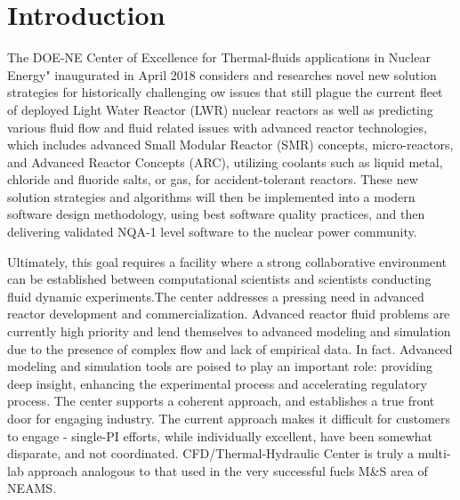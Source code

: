 \section{Introduction}
\label{s:intro}

The DOE-NE Center of Excellence for Thermal-fluids applications in Nuclear Energy" inaugurated in April 2018 considers and researches novel new solution strategies for historically challenging
ow issues that still plague the current fleet of deployed Light Water Reactor (LWR) nuclear reactors as well as predicting various fluid flow and fluid related issues with advanced reactor technologies, which includes advanced Small Modular Reactor (SMR) concepts, micro-reactors, and Advanced Reactor Concepts (ARC), utilizing coolants such as liquid metal, chloride and  fluoride salts, or gas, for accident-tolerant reactors. These new solution strategies and algorithms will then be implemented into a modern software design methodology, using best software quality practices, and then delivering validated NQA-1 level software to the nuclear power community.

Ultimately, this goal requires a facility where a strong collaborative environment can be established between computational scientists and scientists conducting fluid dynamic experiments.The center addresses a pressing need in advanced reactor development and commercialization. Advanced reactor fluid problems are currently high priority and lend themselves to advanced modeling and simulation due to the presence of complex flow and lack of empirical data. In fact. Advanced modeling and simulation tools are poised to play an important role: providing deep insight, enhancing the experimental process and accelerating regulatory process. The center supports a coherent approach, and establishes a true front door for engaging industry. The current approach makes it difficult for customers to engage - single-PI efforts, while individually excellent, have been somewhat disparate, and not coordinated. CFD/Thermal-Hydraulic Center is truly a multi-lab approach analogous to that used in the very successful fuels M\&S area of NEAMS.

